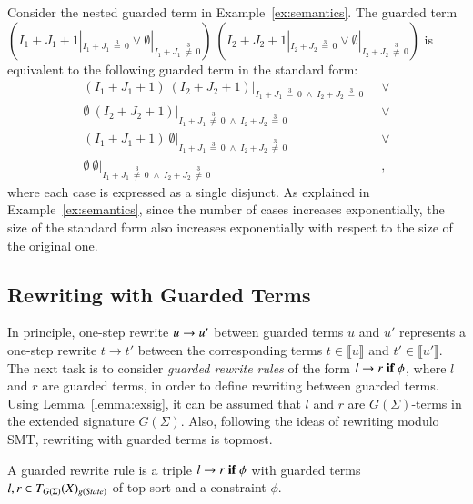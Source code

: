 \begin{example}
Consider the nested guarded term in Example~\ref{ex:semantics}. The guarded term
$(I_1 + J_1 + 1 |_{I_1 + J_1 \,\stackrel{3}{=}\, 0} \vee \emptyset |_{I_1 + J_1 \,\stackrel{3}{\not=}\, 0})\ (I_2 + J_2 + 1 |_{I_2 + J_2 \,\stackrel{3}{=}\, 0} \vee \emptyset |_{I_2 + J_2 \,\stackrel{3}{\not=}\, 0})$
is equivalent to the following guarded term in the standard form:
\begin{align*}
(I_1 + J_1 + 1)\ (I_2 + J_2 + 1) |_{I_1 + J_1 \,\stackrel{3}{=}\, 0 \;\wedge\; I_2 + J_2 \,\stackrel{3}{=}\, 0} &\;\;\vee
\\
\emptyset\ (I_2 + J_2 + 1) |_{I_1 + J_1 \,\stackrel{3}{\not=}\, 0 \;\wedge\; I_2 + J_2 \,\stackrel{3}{=}\, 0}  &\;\;\vee
\\
(I_1 + J_1 + 1)\ \emptyset |_{I_1 + J_1 \,\stackrel{3}{=}\, 0 \;\wedge\; I_2 + J_2 \,\stackrel{3}{\not=}\, 0}  &\;\;\vee
\\
\emptyset\ \emptyset |_{I_1 + J_1 \,\stackrel{3}{\not =}\, 0 \;\wedge\; I_2 + J_2 \,\stackrel{3}{\not =}\, 0} &\;\;,
\end{align*}
where each case is expressed as a single disjunct.  As explained in
Example~\ref{ex:semantics}, since the number of cases increases
exponentially, the size of the standard form also increases
exponentially with respect to the size of the original one.
\end{example}

\subsection{Rewriting with Guarded Terms}
\label{sec:guarded-rew}

In principle, one-step rewrite $u \rightarrow u'$ between guarded terms $u$
and $u'$ represents a one-step rewrite $t \to t'$ between the
corresponding terms $t \in \llbracket u \rrbracket$ and $t' \in
\llbracket u' \rrbracket$.
%
The next task is to consider \emph{guarded rewrite rules} of the form
$l \rightarrow r\;\textnormal{\bf if}\; {\phi}$, where $l$ and $r$ are guarded terms, in order to
define rewriting between guarded terms.
%
Using Lemma~\ref{lemma:exsig}, it can be assumed that $l$ and $r$ are
$G(\Sigma)$-terms in the extended signature $G(\Sigma)$.
%
Also, following the ideas of rewriting modulo SMT, rewriting with
guarded terms is topmost.
%

\begin{definition}
A guarded rewrite rule is a triple $l \rightarrow r\;\textnormal{\bf if}\; {\phi}$ with guarded
terms $l, r \in T_{G(\Sigma)}(X)_{g(\textit{State})}$ of top sort
 and a constraint $\phi$.
\end{definition}

